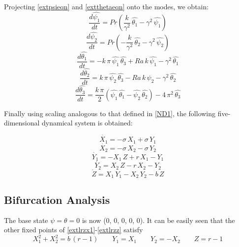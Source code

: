 \documentclass[paper=a4, fontsize=11pt]{scrartcl}
\numberwithin{equation}{section}		%
\numberwithin{figure}{section}			%
\numberwithin{table}{section}				%
\begin{document}
\noindent Projecting \ref{extpsieqn} and \ref{extthetaeqn} onto the modes, we obtain:
\begin{equation}
	\frac{d \hat{\psi_1}}{dt} = Pr \left( \frac{k}{\gamma^2} \, \hat{\theta_1} - \gamma^2 \, \hat{\psi_1} \right)
\end{equation}
\begin{equation}
	\frac{d \hat{\psi_2}}{dt} = Pr \left( -\frac{k}{\gamma^2} \, \hat{\theta_2} - \gamma^2 \, \hat{\psi_2} \right)
\end{equation}
\begin{equation}
	\frac{d \hat{\theta_1}}{dt} = -k \, \pi \, \hat{\psi_1} \, \hat{\theta_3} + Ra \, k \, \hat{\psi_1} - \gamma^2 \, \hat{\theta_1}
\end{equation}
\begin{equation}
	\frac{d \hat{\theta_2}}{dt} = k \, \pi \, \hat{\psi_2} \, \hat{\theta_3} - Ra \, k \, \hat{\psi_2} - \gamma^2 \, \hat{\theta_2}
\end{equation}
\begin{equation}
	\frac{d \hat{\theta_3}}{dt} = \frac{k \, \pi}{2} (\hat{\psi_1} \, \hat{\theta_1} - \hat{\psi_2} \, \hat{\theta_2}) - 4 \, \pi^2 \, \hat{\theta_3}
\end{equation}

\noindent Finally using scaling analogous to that defined in \ref{ND1}, the following five-dimensional dynamical system is obtained:

\begin{equation}
	\dot{X_1} = - \sigma \, X_1 + \sigma \, Y_1
	\label{extlrzx1}
\end{equation}
\begin{equation}
	\dot{X_2} = - \sigma \, X_2 - \sigma \, Y_2
	\label{extlrzx2}
\end{equation}
\begin{equation}
	\dot{Y_1} = -X_1 \, Z + r \, X_1 - Y_1
	\label{extlrzy1}
\end{equation}
\begin{equation}
	\dot{Y_2} = X_2 \, Z - r \, X_2 - Y_2
	\label{extlrzy2}
\end{equation}
\begin{equation}
	\dot{Z} = X_1 \, Y_1 - X_2 \, Y_2 - b \, Z
	\label{extlrzz}
\end{equation}

\subsection{Bifurcation Analysis}
The base state $\psi = \theta = 0$ is now (0, 0, 0, 0, 0). It can be easily seen that the other fixed points of \ref{extlrzx1}-\ref{extlrzz} satisfy
\begin{equation}
	X_1^2 + X_2^2 = b \, (r-1) \qquad Y_1 = X_1 \qquad Y_2 = - X_2 \qquad Z = r - 1
\end{equation}
\end{document}
